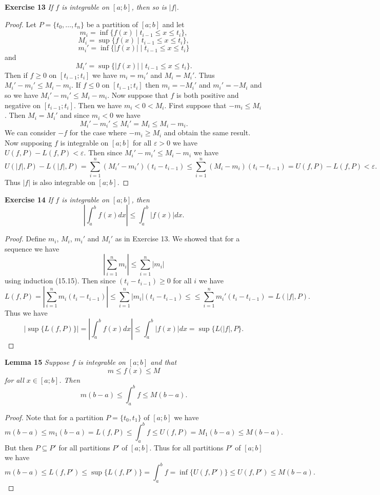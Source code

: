 \documentclass{article}
\begin{document}
\begin{flushleft}
\textbf{Exercise 13}
\textsl{If $f$ is integrable on $[a;b]$, then so is $|f|$.}
\begin{proof}
Let $P = \{t_0, \dots , t_n\}$ be a partition of $[a;b]$ and let
\[
m_i = \inf \{f(x) \mid t_{i-1} \leq x \leq t_i\},
\]
\[
M_i = \sup \{f(x) \mid t_{i-1} \leq x \leq t_i\},
\]
\[
m_i' = \inf \{|f(x)| \mid t_{i-1} \leq x \leq t_i\}
\]
and
\[
M_i' = \sup \{|f(x)| \mid t_{i-1} \leq x \leq t_i\}.
\]
Then if $f \geq 0$ on $[t_{i-1}; t_i]$ we have $m_i = m_i'$ and $M_i = M_i'$. Thus $M_i' - m_i' \leq M_i - m_i$. If $f \leq 0$ on $[t_{i-1}; t_i]$ then $m_i = -M_i'$ and $m_i' = -M_i$ and so we have $M_i' - m_i' \leq M_i - m_i$. Now suppose that $f$ is both positive and negative on $[t_{i-1}; t_i]$. Then we have $m_i < 0 < M_i$. First suppose that $-m_i \leq M_i$. Then $M_i = M_i'$ and since $m_i < 0$ we have
\[
M_i' - m_i' \leq M_i' = M_i \leq M_i - m_i.
\]
We can consider $-f$ for the case where $-m_i \geq M_i$ and obtain the same result. Now supposing $f$ is integrable on $[a;b]$ for all $\varepsilon > 0$ we have $U(f,P) - L(f,P) < \varepsilon$. Then since $M_i' - m_i' \leq M_i - m_i$ we have
\[
U(|f|,P) - L(|f|,P) = \sum_{i=1}^n (M_i' - m_i') (t_i - t_{i-1}) \leq \sum_{i=1}^n (M_i - m_i) (t_i - t_{i-1}) = U(f,P) - L(f,P) < \varepsilon.
\]
Thus $|f|$ is also integrable on $[a;b]$.
\end{proof}

\textbf{Exercise 14}
\textsl{If $f$ is integrable on $[a;b]$, then
\[
\left | \int_a^b f(x) dx \right | \leq \int_a^b |f(x)| dx.
\]}
\begin{proof}
Define $m_i$, $M_i$, $m_i'$ and $M_i'$ as in Exercise 13. We showed that for a sequence we have
\[
\left | \sum_{i=1}^n m_i \right | \leq \sum_{i=1}^n |m_i|
\]
using induction (15.15). Then since $(t_i - t_{i-1}) \geq 0$ for all $i$ we have
\[
L(f,P) = \left | \sum_{i=1}^n m_i (t_i - t_{i-1}) \right | \leq \sum_{i=1}^n |m_i| (t_i - t_{i-1}) \leq \leq \sum_{i=1}^n m_i' (t_i - t_{i-1}) = L(|f|,P).
\]
Thus we have
\[
| \sup \{L(f,P)\} | = \left | \int_a^b f(x) dx \right | \leq \int_a^b |f(x)| dx = \sup \{L(|f|,P\}.
\]
\end{proof}

\textbf{Lemma 15}
\textsl{Suppose $f$ is integrable on $[a;b]$ and that
\[
m \leq f(x) \leq M
\]
for all $x \in [a;b]$. Then
\[
m (b-a) \leq \int_a^b f \leq M (b-a).
\]}
\begin{proof}
Note that for a partition $P = \{t_0, t_1\}$ of $[a;b]$ we have
\[
m (b-a) \leq m_1 (b-a) = L(f,P) \leq \int_a^b f \leq U(f,P) = M_1 (b-a) \leq M (b-a).
\]
But then $P \subseteq P'$ for all partitions $P'$ of $[a;b]$. Thus for all partitions $P'$ of $[a;b]$ we have
\[
m (b-a) \leq L(f,P') \leq \sup \{L(f,P')\} = \int_a^b f = \inf \{U(f,P')\} \leq U(f,P') \leq M (b-a).
\]
\end{proof}


\end{flushleft}
\end{document}
